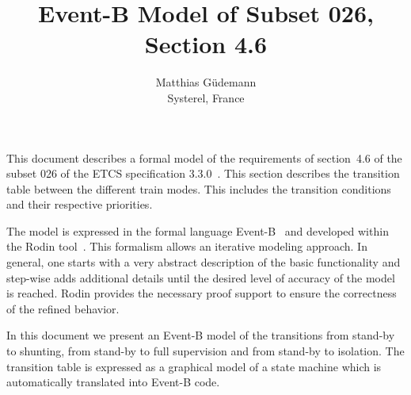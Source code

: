 \documentclass{template/openetcs_article}
\begin{document}
\frontmatter
{}





\newcommand{\true}{\ensuremath{true}}
\newcommand{\btext}[1]{{\it #1}}
\newcommand{\bvar}[1]{\btext{#1}}
\newcommand{\bevent}[1]{\btext{#1}}
\newcommand{\binv}[1]{\btext{#1}}
\newcommand{\bconst}[1]{\btext{#1}}
\newcommand{\bparam}[1]{\btext{#1}}
\newcommand{\bfunc}[1]{\btext{#1}}
\newcommand{\baxiom}[1]{\btext{#1}}
\newcommand{\btype}[1]{\btext{#1}}
\newcommand{\bguard}[1]{\btext{#1}}
\newcommand{\bmachine}[1]{\btext{#1}}
\newcommand{\bctx}[1]{\btext{#1}}

\author{Matthias Güdemann\\Systerel, France}


\title{Event-B Model of Subset 026, Section 4.6}




\maketitle
\tableofcontents
\listoffiguresandtables
\newpage

This document describes a formal model of the requirements of section~4.6 of the
subset 026 of the ETCS specification 3.3.0~\cite{ETCS}. This section describes
the transition table between the different train modes. This includes the
transition conditions and their respective priorities.

The model is expressed in the formal language Event-B~\cite{eventB} and
developed within the Rodin tool~\cite{rodin}. This formalism allows an iterative
modeling approach. In general, one starts with a very abstract description of
the basic functionality and step-wise adds additional details until the desired
level of accuracy of the model is reached. Rodin provides the necessary proof
support to ensure the correctness of the refined behavior.

In this document we present an Event-B model of the transitions from stand-by to
shunting, from stand-by to full supervision and from stand-by to isolation. The
transition table is expressed as a graphical model of a state machine which is
automatically translated into Event-B code.
\end{document}
